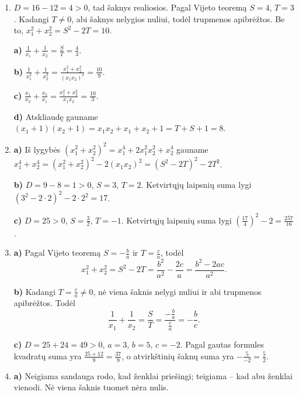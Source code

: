 \documentclass[12pt,a4paper]{article}
\begin{document}
\begin{enumerate}
\textbf{a)} $D=1>0$, $S=5$, $T=6$; kvadratų suma $25-12=13$, kubų suma $125-90=35$.

\textbf{b)} $D=25>0$, $S=-1$, $T=-6$; kvadratų suma $1+12=13$, kubų suma $-1-18=-19$.

\textbf{c)} $D=25>0$, $S=\frac{3}{2}$, $T=-1$; kvadratų suma $\frac{17}{4}$, kubų suma $\frac{27}{8}+\frac{9}{2}=\frac{63}{8}$.

\textbf{d)} $D=0$, todėl vienintelę šaknį laikome dviem sutampančiomis. $S=4$, $T=4$; kvadratų suma $16-8=8$, kubų suma $64-48=16$.
\item $D=16-12=4>0$, tad šaknys realiosios. Pagal Vijeto teoremą $S=4$, $T=3$. Kadangi $T\ne0$, abi šaknys nelygios nuliui, todėl trupmenos apibrėžtos. Be to, $x_1^2+x_2^2=S^2-2T=10$.

\textbf{a)} $\frac{1}{x_1}+\frac{1}{x_2}=\frac{S}{T}=\frac{4}{3}$.

\textbf{b)} $\frac{1}{x_1^2}+\frac{1}{x_2^2}=\frac{x_1^2+x_2^2}{(x_1x_2)^2}=\frac{10}{9}$.

\textbf{c)} $\frac{x_1}{x_2}+\frac{x_2}{x_1}=\frac{x_1^2+x_2^2}{x_1x_2}=\frac{10}{3}$.

\textbf{d)} Atskliaudę gauname $(x_1+1)(x_2+1)=x_1x_2+x_1+x_2+1=T+S+1=8$.
\item \textbf{a)} Iš lygybės $(x_1^2+x_2^2)^2=x_1^4+2x_1^2x_2^2+x_2^4$ gauname $x_1^4+x_2^4=(x_1^2+x_2^2)^2-2(x_1x_2)^2=(S^2-2T)^2-2T^2$.

\textbf{b)} $D=9-8=1>0$, $S=3$, $T=2$. Ketvirtųjų laipsnių suma lygi $(3^2-2\cdot2)^2-2\cdot2^2=17$.

\textbf{c)} $D=25>0$, $S=\frac{3}{2}$, $T=-1$. Ketvirtųjų laipsnių suma lygi $\left(\frac{17}{4}\right)^2-2=\frac{257}{16}$.
\item \textbf{a)} Pagal Vijeto teoremą $S=-\frac{b}{a}$ ir $T=\frac{c}{a}$, todėl
\[x_1^2+x_2^2=S^2-2T=\frac{b^2}{a^2}-\frac{2c}{a}=\frac{b^2-2ac}{a^2}.\]

\textbf{b)} Kadangi $T=\frac{c}{a}\ne0$, nė viena šaknis nelygi nuliui ir abi trupmenos apibrėžtos. Todėl
\[\frac{1}{x_1}+\frac{1}{x_2}=\frac{S}{T}=\frac{-\frac{b}{a}}{\frac{c}{a}}=-\frac{b}{c}.\]

\textbf{c)} $D=25+24=49>0$, $a=3$, $b=5$, $c=-2$. Pagal gautas formules kvadratų suma yra $\frac{25+12}{9}=\frac{37}{9}$, o atvirkštinių šaknų suma yra $-\frac{5}{-2}=\frac{5}{2}$.
\item \textbf{a)} Neigiama sandauga rodo, kad ženklai priešingi; teigiama – kad abu ženklai vienodi. Nė viena šaknis tuomet nėra nulis.


\end{enumerate}
\end{document}
